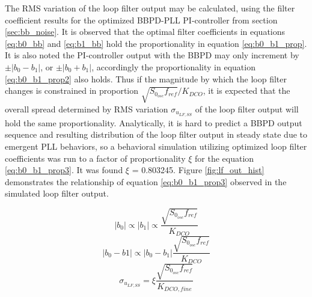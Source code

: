 	The RMS variation of the loop filter output may be calculated, using the filter coefficient results for the optimized BBPD-PLL PI-controller from section \ref{sec:bb_noise}. It is observed that the optimal filter coefficients in equations \ref{eq:b0_bb} and \ref{eq:b1_bb} hold the proportionality in equation \ref{eq:b0_b1_prop}. It is also noted the PI-controller output with the BBPD may only increment by $\pm|b_0-b_1|$, or $\pm|b_0+b_1|$, accordingly the proportionality in equation \ref{eq:b0_b1_prop2} also holds. Thus if the magnitude by which the loop filter changes is constrained in proportion $\sqrt{S_{0_{osc}}f_{ref}}/K_{DCO}$, it is expected that the overall spread determined by RMS variation $\sigma_{u_{LF,SS}}$ of the loop filter output will hold the same proportionality. Analytically, it is hard to predict a BBPD output sequence and resulting distribution of the loop filter output in steady state due to emergent PLL behaviors, so a behavioral simulation utilizing optimized loop filter coefficients was run to a factor of proportionality $\xi$ for the equation \ref{eq:b0_b1_prop3}. It was found $\xi$ = 0.803245. Figure \ref{fig:lf_out_hist} demonstrates the relationship of equation \ref{eq:b0_b1_prop3} observed in the simulated loop filter output.

	\begin{equation}\label{eq:b0_b1_prop}
		|b_0| \propto |b_1| \propto \frac{\sqrt{S_{0_{osc}}f_{ref}}}{K_{DCO}}
	\end{equation}
	\begin{equation}\label{eq:b0_b1_prop2}
		|b_0-b1| \propto |b_0-b_1|  \frac{\sqrt{S_{0_{osc}}f_{ref}}}{K_{DCO}} 
	\end{equation}
	\begin{equation}\label{eq:b0_b1_prop3}
		\sigma_{u_{LF,SS}} =  \xi \frac{\sqrt{S_{0_{osc}}f_{ref}}}{K_{DCO,fine}} 
	\end{equation}


